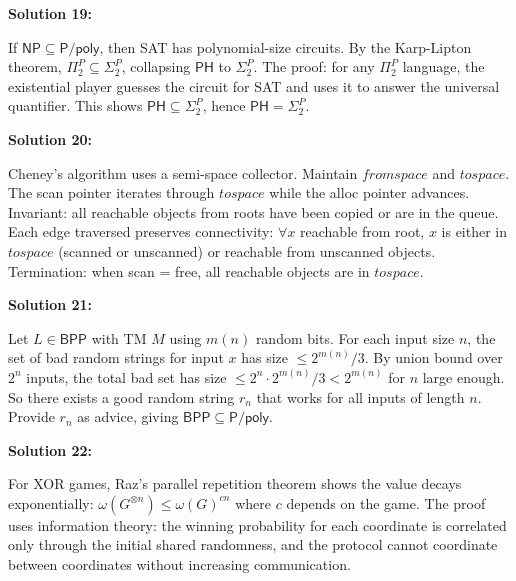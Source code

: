 \documentclass[12pt,a4paper]{exam}
\begin{document}
\vspace{0.5cm}

\textbf{Solution 19:}

If $\mathsf{NP} \subseteq \mathsf{P}/\mathsf{poly}$, then SAT has polynomial-size circuits. By the Karp-Lipton theorem, $\Pi_2^P \subseteq \Sigma_2^P$, collapsing $\mathsf{PH}$ to $\Sigma_2^P$. The proof: for any $\Pi_2^P$ language, the existential player guesses the circuit for SAT and uses it to answer the universal quantifier. This shows $\mathsf{PH} \subseteq \Sigma_2^P$, hence $\mathsf{PH} = \Sigma_2^P$.

\vspace{0.5cm}

\textbf{Solution 20:}

Cheney's algorithm uses a semi-space collector. Maintain $fromspace$ and $tospace$. The scan pointer iterates through $tospace$ while the alloc pointer advances. Invariant: all reachable objects from roots have been copied or are in the queue. Each edge traversed preserves connectivity: $\forall x$ reachable from root, $x$ is either in $tospace$ (scanned or unscanned) or reachable from unscanned objects. Termination: when scan = free, all reachable objects are in $tospace$.

\vspace{0.5cm}

\textbf{Solution 21:}

Let $L \in \mathsf{BPP}$ with TM $M$ using $m(n)$ random bits. For each input size $n$, the set of bad random strings for input $x$ has size $\leq 2^{m(n)}/3$. By union bound over $2^n$ inputs, the total bad set has size $\leq 2^n \cdot 2^{m(n)}/3 < 2^{m(n)}$ for $n$ large enough. So there exists a good random string $r_n$ that works for all inputs of length $n$. Provide $r_n$ as advice, giving $\mathsf{BPP} \subseteq \mathsf{P}/\mathsf{poly}$.

\vspace{0.5cm}

\textbf{Solution 22:}

For XOR games, Raz's parallel repetition theorem shows the value decays exponentially: $\omega(G^{\otimes n}) \leq \omega(G)^{c n}$ where $c$ depends on the game. The proof uses information theory: the winning probability for each coordinate is correlated only through the initial shared randomness, and the protocol cannot coordinate between coordinates without increasing communication.

\vspace{0.5cm}
\end{document}
